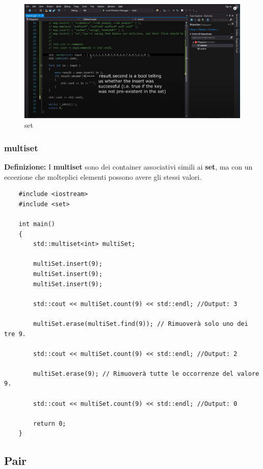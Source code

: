 \begin{figure}[H]
	\centering
	\includegraphics[width=1.2\textwidth, height=1.2\textheight, keepaspectratio]{./imgs/set_insert_second_operations.png}
	\caption{set}
	\label{fig:set_insert_second_operations}
\end{figure}

\subsubsection{multiset}

\textsf{\small \textbf{Definizione: } I \textbf{multiset} sono dei container associativi simili ai \textbf{set}, ma con un eccezione che molteplici elementi possono avere gli stessi valori.} \\

\begin{lstlisting}
	#include <iostream>
	#include <set>
	
	int main()
	{
		std::multiset<int> multiSet;
		
		multiSet.insert(9);
		multiSet.insert(9);
		multiSet.insert(9);
		
		std::cout << multiSet.count(9) << std::endl; //Output: 3
		
		multiSet.erase(multiSet.find(9)); // Rimuoverà solo uno dei tre 9.
		
		std::cout << multiSet.count(9) << std::endl; //Output: 2
		
		multiSet.erase(9); // Rimuoverà tutte le occorrenze del valore 9.
		
		std::cout << multiSet.count(9) << std::endl; //Output: 0
		
		return 0;
	}
\end{lstlisting}

\subsection{Pair}

